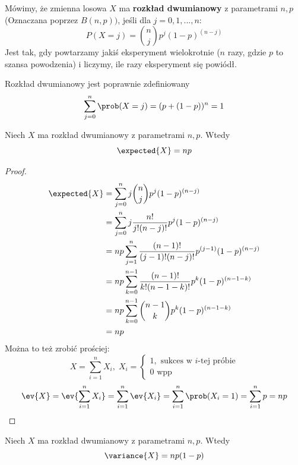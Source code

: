 \begin{definition}
	Mówimy, że zmienna losowa \( X \) ma \textbf{rozkład dwumianowy} z parametrami \( n, p \) (Oznaczana poprzez \(B(n, p))\), jeśli
	dla \( j = 0, 1,..., n \):
	\[
		P(X = j) = \binom{n}{j}p^j(1-p)^{(n-j)}
	\]
	Jest tak, gdy powtarzamy jakiś eksperyment wielokrotnie (\(n\) razy, gdzie \(p\) to szansa powodzenia) i liczymy, ile razy eksperyment się powiódł.
\end{definition}

\begin{fact} Rozkład dwumianowy jest poprawnie zdefiniowany
	\[
		\sum_{j = 0}^{n} \prob(X = j) = (p + (1 - p))^n = 1
	\]
\end{fact}

\begin{theorem}
	Niech \( X \) ma rozkład dwumianowy z parametrami \(n, p \). Wtedy
	\[
		\expected{X} = np
	\]
\end{theorem}

\begin{proof}
	\begin{align*}
		\expected{X}
		 & = \sum_{j=0}^nj\binom{n}{j}p^j(1-p)^{(n-j)}                       \\
		 & = \sum_{j=0}^nj\frac{n!}{j!(n-j)!}p^j(1-p)^{(n-j)}                \\
		 & = np\sum_{j=1}^n\frac{(n-1)!}{(j-1)!(n-j)!}p^{(j-1)}(1-p)^{(n-j)} \\
		 & = np\sum_{k=0}^{n-1}\frac{(n-1)!}{k!(n-1-k)!}p^{k}(1-p)^{(n-1-k)} \\
		 & = np\sum_{k=0}^{n-1}\binom{n-1}{k}p^{k}(1-p)^{(n-1-k)}            \\
		 & = np
	\end{align*}
	Można to też zrobić prościej:
	\[
		X = \sum_{i = 1}^{n} X_i, \; X_i = \begin{cases}
			1, \text{ sukces w } i \text{-tej próbie} \\
			0 \text{ wpp}
		\end{cases}
	\]
	\[
		\ev{X} = \ev{\sum_{i = 1}^{n} X_i} = \sum_{i = 1}^{n} \ev{X_i} = \sum_{i = 1}^{n} \prob(X_i = 1) = \sum_{i = 1}^{n} p = np
	\]
\end{proof}

\begin{theorem}
	Niech \( X \) ma rozkład dwumianowy z parametrami \(n, p \). Wtedy
	\[
		\variance{X} = np(1-p)
	\]
\end{theorem}

